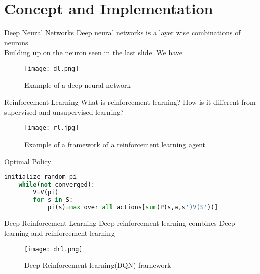 
\section{Concept and Implementation }
\frame{\sectionpage}

\begin{frame}{Deep Neural Networks}
    Deep neural networks is a layer wise combinations of neurons\\
    Building up on the neuron seen in the last slide. We have
    \begin{figure}
        \centering
        \texttt{[image: dl.png]}\\
        \caption{Example of a deep neural network}
        \label{fig:dl}
    \end{figure}
\end{frame}

\begin{frame}{Reinforcement Learning}
    What is reinforcement learning? How is it different from supervised and unsupervised learning?
    \begin{figure}
        \centering
        \texttt{[image: rl.jpg]}\\
        \caption{Example of a framework of a reinforcement learning agent }
        \label{fig:rl}
    \end{figure}
\end{frame}

\begin{frame}[fragile]{Optimal Policy}    
    \begin{lstlisting}[language=python, caption=Policy iteration algorithm]
    initialize random pi
    while(not converged):
        V=V(pi)
        for s in S:
            pi(s)=max over all actions[sum(P(s,a,s')V(S'))]
    \end{lstlisting}
\end{frame}

\begin{frame}{Deep Reinforcement Learning}
    Deep reinforcement learning combines Deep learning and reinforcement learning
    \begin{figure}
        \centering
        \texttt{[image: drl.png]}\\
        \caption{Deep Reinforcement learning(DQN) framework}
        \label{fig:drl}
    \end{figure}
\end{frame}

